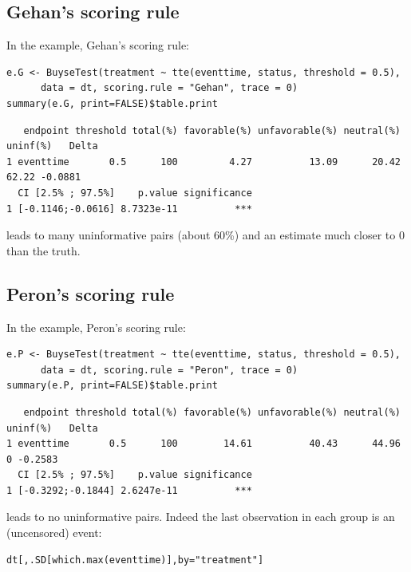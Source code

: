 \documentclass[12pt]{article}
\begin{document}
\subsection{Gehan's scoring rule}
\label{sec:orgbe4b9a6}
In the example, Gehan's scoring rule:
\lstset{language=r,label= ,caption= ,captionpos=b,numbers=none}
\begin{lstlisting}
e.G <- BuyseTest(treatment ~ tte(eventtime, status, threshold = 0.5),
	  data = dt, scoring.rule = "Gehan", trace = 0)
summary(e.G, print=FALSE)$table.print
\end{lstlisting}

\begin{verbatim}
   endpoint threshold total(%) favorable(%) unfavorable(%) neutral(%) uninf(%)   Delta
1 eventtime       0.5      100         4.27          13.09      20.42    62.22 -0.0881
  CI [2.5% ; 97.5%]    p.value significance
1 [-0.1146;-0.0616] 8.7323e-11          ***
\end{verbatim}


leads to many uninformative pairs (about 60\%) and an estimate much
closer to 0 than the truth.

\subsection{Peron's scoring rule}
\label{sec:org0f638bf}
In the example, Peron's scoring rule:
\lstset{language=r,label= ,caption= ,captionpos=b,numbers=none}
\begin{lstlisting}
e.P <- BuyseTest(treatment ~ tte(eventtime, status, threshold = 0.5),
	  data = dt, scoring.rule = "Peron", trace = 0)
summary(e.P, print=FALSE)$table.print
\end{lstlisting}

\begin{verbatim}
   endpoint threshold total(%) favorable(%) unfavorable(%) neutral(%) uninf(%)   Delta
1 eventtime       0.5      100        14.61          40.43      44.96        0 -0.2583
  CI [2.5% ; 97.5%]    p.value significance
1 [-0.3292;-0.1844] 2.6247e-11          ***
\end{verbatim}

leads to no uninformative pairs. Indeed the last observation in each group is an (uncensored) event:
\lstset{language=r,label= ,caption= ,captionpos=b,numbers=none}
\begin{lstlisting}
dt[,.SD[which.max(eventtime)],by="treatment"]
\end{lstlisting}
\end{document}
